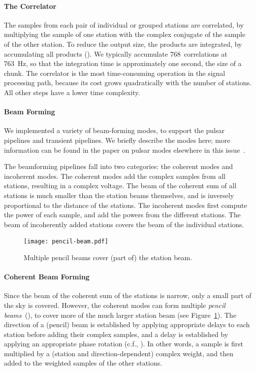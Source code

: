\paragraph{The Correlator }
The samples from each pair of individual or grouped stations are
correlated, by multiplying the sample of one station with the complex conjugate
of the sample of the other station.
To reduce the output size, the products are integrated, by accumulating all
products ().
We typically accumulate 768~correlations at 763~Hz, so that the integration
time is approximately one second, the size of a chunk.
The correlator is the most time-consuming operation in the signal
processing path, because its cost grows quadratically with the number of
stations.
All other steps have a lower time complexity.


\paragraph{Beam Forming}
\label{sec:beam-forming}
We implemented a variety of beam-forming modes, to support the pulsar pipelines
and transient pipelines.
We briefly describe the modes here; more information can be found in the
paper on pulsar modes elsewhere in this issue~\cite{Hessels:10}.

The beamforming pipelines fall into two categories: the coherent modes and
incoherent modes.
The coherent modes add the complex samples from all stations, resulting in a
complex voltage.
The beam of the coherent sum of all stations is much smaller than the station
beams themselves, and is inversely proportional to the distance of the stations.
The incoherent modes first compute the power of each sample, and add the
powers from the different stations.
The beam of incoherently added stations covers the beam of the individual
stations.


\begin{figure}
\vspace{-9mm}
\begin{center}
\texttt{[image: pencil-beam.pdf]}
\end{center}
\caption{Multiple pencil beams cover (part of) the station beam.}
\vspace{-5mm}
\label{fig:pencil-beams}
\end{figure}
\paragraph{Coherent Beam Forming}
Since the beam of the coherent sum of the stations is narrow, only a small
part of the sky is covered.
However, the coherent modes can form multiple
\emph{pencil beams\/}~(), to cover more of the much larger
station beam (see Figure~\ref{fig:pencil-beams}).
The direction of a (pencil) beam is established by applying appropriate
delays to each station before adding their complex samples, and a delay is
established by applying an appropriate phase rotation (c.f., ).
In other words, a sample is first multiplied by a (station and
direction-dependent) complex weight, and then added to the weighted samples
of the other stations.

